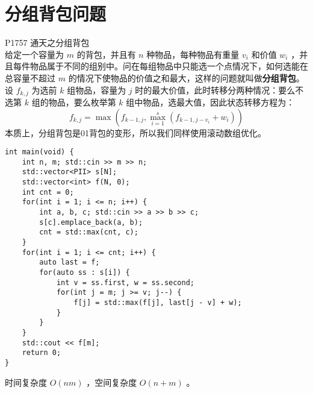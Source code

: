 \documentclass{beamer}
\newcommand{\fdf}[1]{\alert{\textbf{#1}}}
\begin{document}
\section{分组背包问题}
\begin{frame}
P1757 通天之分组背包\\ 
给定一个容量为 $m$ 的背包，并且有 $n$ 种物品，每种物品有重量 $v_i$ 和价值 $w_i$ ，并且每件物品属于不同的组别中。问在每组物品中只能选一个点情况下，如何选能在总容量不超过 $m$ 的情况下使物品的价值之和最大，这样的问题就叫做\fdf{分组背包}。 \\
设 $f_{k, j}$ 为选前 $k$ 组物品，容量为 $j$ 时的最大价值，此时转移分两种情况：要么不选第 $k$ 组的物品，要么枚举第 $k$ 组中物品，选最大值，因此状态转移方程为：
$$f_{k, j} = \max(f_{k - 1, j}, \max_{i = 1}^{s}(f_{k - 1, j - v_i} + w_i))$$
本质上，分组背包是01背包的变形，所以我们同样使用滚动数组优化。
\end{frame}
\begin{frame}[fragile]
\begin{onlyenv}
\begin{verbatim}
int main(void) {
    int n, m; std::cin >> m >> n;
    std::vector<PII> s[N];
    std::vector<int> f(N, 0);
    int cnt = 0;
    for(int i = 1; i <= n; i++) {
        int a, b, c; std::cin >> a >> b >> c;
        s[c].emplace_back(a, b);
        cnt = std::max(cnt, c);
    }
    for(int i = 1; i <= cnt; i++) {
        auto last = f;
        for(auto ss : s[i]) {
            int v = ss.first, w = ss.second;
            for(int j = m; j >= v; j--) {
                f[j] = std::max(f[j], last[j - v] + w);
            }
        }
    }
    std::cout << f[m];
    return 0;
}
\end{verbatim}
\end{onlyenv}
时间复杂度 $O(nm)$ ，空间复杂度 $O(n + m)$ 。
\end{frame}
\end{document}
